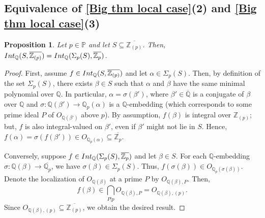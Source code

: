 \documentclass{article}
\newtheorem{Prop}[equation]{Proposition}
\theoremstyle{definition}\newtheorem{Def}[equation]{Definition}
\theoremstyle{definition}\newtheorem{Ques}[equation]{Question}
\theoremstyle{definition}\newtheorem{Conj}[equation]{Conjecture}
\theoremstyle{definition}\newtheorem{Not}[equation]{Notation}
\newcommand{\Q}{\mathbb{Q}}
\newcommand{\oQ}{\overline{\Q}}
\newcommand{\Z}{\mathbb{Z}}
\newcommand{\oZp}{\overline{\Z_p}}
\newcommand{\oQZp}{\overline{\Z_{(p)}}}
\newcommand{\oQp}{\overline{\Q_p}}
\newcommand{\Int}{\textnormal{Int}}
\newcommand{\IntQ}{\Int_{\Q}}
\newcommand{\PP}{\mathbb{P}}
\numberwithin{equation}{section}
\begin{document}
\subsection*{Equivalence of \ref{Big thm local case}(2) and \ref{Big thm local case}(3)}
\begin{Prop}\label{IntAnpcompletion}
Let $p \in \PP$ and let $S \subseteq \oQZp$. Then, $\IntQ(S,\oQZp) = \IntQ(\Sigma_p(S),\oZp)$. %
\end{Prop}
\begin{proof}
First, assume $f \in \IntQ(S,\oQZp)$ and let $\alpha \in \Sigma_p(S)$. Then, by definition of the set $\Sigma_p(S)$, there exists $\beta \in S$ such that $\alpha$ and $\beta$ have the same minimal polynomial over $\Q$. In particular, $\alpha = \sigma(\beta')$, where $\beta'\in\oQ$ is a conjugate of $\beta$ over $\Q$ and $\sigma:\Q(\beta') \to \Q_p(\alpha)$ is a $\Q$-embedding (which corresponds to some prime ideal $P$ of $O_{\Q(\beta')}$ above $p$). By assumption, $f(\beta)$ is integral over $\Z_{(p)}$; but, $f$ is also integral-valued on $\beta'$, even if $\beta'$ might not lie in $S$. Hence, $f(\alpha) = \sigma(f(\beta')) \in O_{\Q_p(\alpha)} \subseteq \oZp$.

Conversely, suppose $f \in \IntQ(\Sigma_p(S), \oZp)$ and let $\beta \in S$. For each $\Q$-embedding $\sigma: \Q(\beta) \to \oQp$, we have $\sigma(\beta) \in \Sigma_p(S)$. Thus, $f(\sigma(\beta)) \in O_{\Q_p(\sigma(\beta))}$. Denote the localization of $O_{\Q(\beta)}$ at a prime $P$ by $O_{\Q(\beta), P}$. Then,
\begin{equation*}
f(\beta) \in \bigcap_{P|p} O_{\Q(\beta), P} = O_{\Q(\beta),(p)}.
\end{equation*}
Since $O_{\Q(\beta),(p)} \subseteq \overline{\Z_{(p)}}$, we obtain the desired result.
\end{proof}

\end{document}
